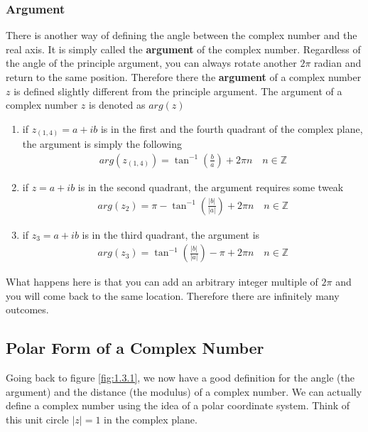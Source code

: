 \documentclass[12pt]{book}
\newcommand{\Z}{\mathbb{Z}}
\newcommand{\paren}[1]{\left( #1 \right)}
\newcommand{\abso}[1]{\left|#1 \right|}
\begin{document}
\subsubsection{Argument}
There is another way of defining the angle between the complex number and the real axis. It is simply called the \textbf{argument} of the complex number. Regardless of the angle of the principle argument, you can always rotate another $2\pi$ radian and return to the same position. Therefore there the \textbf{argument} of a complex number $z$ is defined slightly different from the principle argument. The argument of a complex number $z$ is denoted as $arg(z)$
\begin{enumerate}
    \item if $z_{(1,4)}=a+ib$ is in the first and the fourth quadrant of the complex plane, the argument is simply the following
    \begin{align}
        arg(z_{(1,4)}) = \tan^{-1}\paren{\frac{b}{a}} + 2\pi n \quad n \in \Z
    \end{align}
    \item if $z = a+ib$ is in the second quadrant, the argument requires some tweak
    \begin{align}
        arg\paren{z_2} = \pi - \tan^{-1}\paren{\frac{|b|}{|a|}} + 2\pi n \quad n \in \Z
    \end{align}
    \item if $z_3=a+ib$ is in the third quadrant, the argument is
    \begin{align}
        arg(z_3) = \tan^{-1}\paren{\frac{|b|}{|a|}} - \pi + 2\pi n \quad n \in \Z
    \end{align}
\end{enumerate}
What happens here is that you can add an arbitrary integer multiple of $2\pi$ and you will come back to the same location. Therefore there are infinitely many outcomes. 

\subsection{Polar Form of a Complex Number}
Going back to figure \ref{fig:1.3.1}, we now have a good definition for the angle (the argument) and the distance (the modulus) of a complex number. We can actually define a complex number using the idea of a polar coordinate system. Think of this unit circle $\abso{z} = 1$ in the complex plane. 
\end{document}
